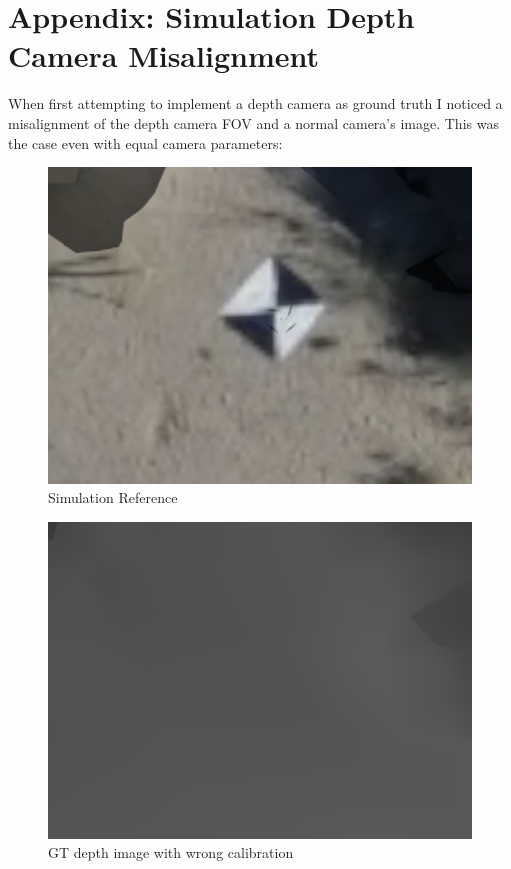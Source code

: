 \chapter{Appendix: Simulation Depth Camera Misalignment}\label{chapter:appendix:gz_depth_camera}

When first attempting to implement a depth camera as ground truth I noticed a misalignment of the depth camera FOV and a normal camera's image. This was the case even with equal camera parameters:


\begin{figure}[ht]
    \centering
    \includegraphics[scale=0.4]{images/preparation/GT_error_sim.png}
    \caption{Simulation Reference}
    \label{fig:GT_error_sim}
\end{figure}
\begin{figure}
    \centering
    \includegraphics[scale=0.4]{images/preparation/GT_error_GT.png}
    \caption{GT depth image with wrong calibration}
    \label{fig:GT_error_GT} %
\end{figure}

